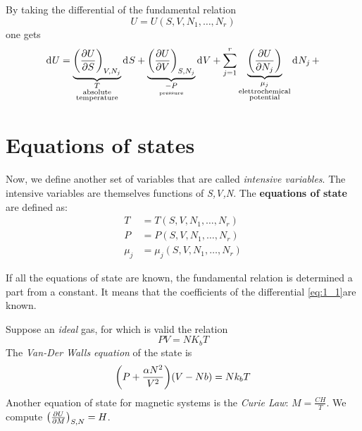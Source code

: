 \documentclass[../main/main.tex]{subfiles}
\begin{document}
By taking the differential of the fundamental relation
\begin{equation}
  U=U(S,V,N_1,\dots , N_r)
  \label{eq:}
\end{equation}
one gets
\begin{equation}
  \dd[]{U} = \underbrace{ \qty(\pdv{U}{S})_{V,N_j}}_{\underset{ \substack{ \text{absolute} \\ \text{temperature}} }{T} } \dd[]{S} +
\underbrace{   \qty(\pdv{U}{V})_{S,N_j} }_{\underset{\text{pressure}}{-P} }\dd[]{V} + \sum_{j=1}^{r} \underbrace{ \qty(\pdv{U}{N_j} )}_{\underset{ \substack{ \text{elettrochemical} \\ \text{potential}} }{\mu _j} } \dd[]{N_j} +
  \label{eq:1_1}
\end{equation}

\section{Equations of states}
Now, we define another set of variables that are called \textit{intensive variables}. The intensive variables are themselves functions of \emph{S,V,N}. The \textbf{equations of state} are defined as:
\begin{subequations}
\begin{align}
  T &= T (S,V,N_1,\dots,N_r) \\
  P &= P (S,V,N_1,\dots,N_r) \\
  \mu _j &= \mu _j (S,V,N_1,\dots,N_r)
\end{align}
\label{}
\end{subequations}
\begin{observation}
If all the equations of state are known, the fundamental relation is determined a part from a constant. It means that the coefficients of the differential \eqref{eq:1_1}are known.
\end{observation}
\begin{example}
Suppose an \emph{ideal} gas, for which is valid the relation
\begin{equation*}
  P V = N K_b T
\end{equation*}
The \emph{Van-Der Walls equation} of the state is
\begin{equation*}
  \qty(P+\frac{\alpha N^2}{V^2})\qty(V-Nb) = N k_b T
\end{equation*}
Another equation of state for magnetic systems is the \emph{Curie Law}: \( M=\frac{C H}{T} \). We compute \( \qty(\pdv{U}{M} )_{S,N}=H  \).
\end{example}
\end{document}
